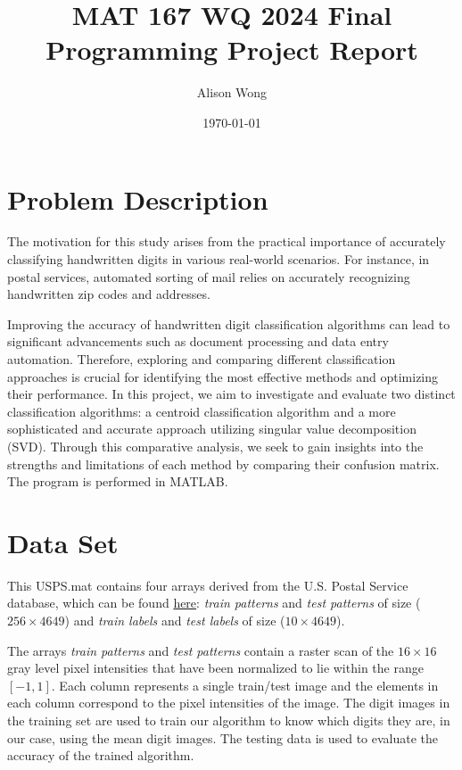 \documentclass{article}
\title{MAT 167 WQ 2024 Final Programming Project Report}
\author{Alison Wong}
\date{\today}
\begin{document}
\maketitle
\tableofcontents
\newpage

\section{Problem Description}

The motivation for this study arises from the practical importance of accurately classifying handwritten digits in various real-world scenarios. For instance, in postal services, automated sorting of mail relies on accurately recognizing handwritten zip codes and addresses. 

Improving the accuracy of handwritten digit classification algorithms can lead to significant advancements such as document processing and data entry automation. Therefore, exploring and comparing different classification approaches is crucial for identifying the most effective methods and optimizing their performance. In this project, we aim to investigate and evaluate two distinct classification algorithms: a centroid classification algorithm and a more sophisticated and accurate approach utilizing singular value decomposition (SVD). Through this comparative analysis, we seek to gain insights into the strengths and limitations of each method by comparing their confusion matrix. The program is performed in MATLAB.

\section{Data Set}

This USPS.mat contains four arrays derived from the U.S. Postal Service database, which can be found \href{https://gaussianprocess.org/gpml/data/}{here}:
\textit{train patterns} and \textit{test patterns} of size ($256 \times 4649$) and
\textit{train labels} and \textit{test labels} of size ($10 \times 4649$).

The arrays \textit{train patterns} and \textit{test patterns} contain a raster scan of the $16 \times 16$ gray level pixel intensities that have been normalized to lie within the range $[-1, 1]$. Each column represents a single train/test image and the elements in each column correspond to the pixel intensities of the image. The digit images in the training set are used to train our algorithm to know which digits they are, in our case, using the mean digit images. The testing data is used to evaluate the accuracy of the trained algorithm. 
\end{document}
